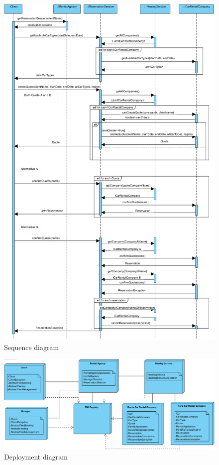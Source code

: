 \documentclass{ds-report}
\begin{document}
	
	\clearpage
\begin{figure}
  \includegraphics[width=\linewidth]{sequence_diagram.png}
  \caption{Sequence diagram}
  \label{fig:sequence_diagram}
\end{figure}
\begin{figure}[ht]
  \includegraphics[width=\linewidth]{deployment_diagram.png}
  \caption{Deployment diagram}
  \label{fig:deployment_diagram}
\end{figure}
	
\end{document}
